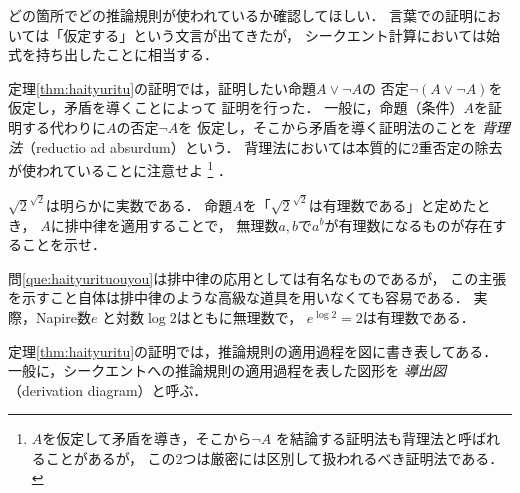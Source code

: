  どの箇所でどの推論規則が使われているか確認してほしい．
 言葉での証明においては「仮定する」という文言が出てきたが，
 シークエント計算においては始式を持ち出したことに相当する．
 
 定理\ref{thm:haityuritu}の証明では，証明したい命題$A \lor \lnot A$の
 否定$\lnot ( A \lor \lnot A )$を仮定し，矛盾を導くことによって
 証明を行った．
 一般に，命題（条件）$A$を証明する代わりに$A$の否定$\lnot A$を
 仮定し，そこから矛盾を導く証明法のことを
 \emph{背理法}（reductio ad absurdum）という．
 背理法においては本質的に2重否定の除去が使われていることに注意せよ
 \footnote{$A$を仮定して矛盾を導き，そこから$\lnot A$
 を結論する証明法も背理法と呼ばれることがあるが，
 この2つは厳密には区別して扱われるべき証明法である．}
 ．
 
 \begin{que} \label{que:haityurituouyou}
   $\sqrt{2} ^{\sqrt{2}}$は明らかに実数である．
   命題$A$を「$\sqrt{2}^{\sqrt{2}}$は有理数である」と定めたとき，
   $A$に排中律を適用することで，
   無理数$a,  b$で$a^b$が有理数になるものが存在することを示せ．
 \end{que}

 問\ref{que:haityurituouyou}は排中律の応用としては有名なものであるが，
 この主張を示すこと自体は排中律のような高級な道具を用いなくても容易である．
 実際，Napire数$e$
 と対数$\log 2$はともに無理数で，
 $e^{\log 2 } = 2$は有理数である．

 定理\ref{thm:haityuritu}の証明では，推論規則の適用過程を図に書き表してある．
 一般に，シークエントへの推論規則の適用過程を表した図形を
 \emph{導出図}（derivation diagram）と呼ぶ．


